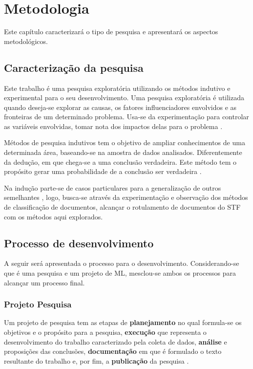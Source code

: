 \chapter[Metodologia]{Metodologia}
Este capítulo caracterizará o tipo de pesquisa e apresentará os aspectos metodológicos.

\section{Caracterização da pesquisa}

Este trabalho é uma pesquisa exploratória utilizando os métodos indutivo e experimental para o seu desenvolvimento. Uma pesquisa exploratória é utilizada quando deseja-se explorar as causas, os fatores influenciadores envolvidos e as fronteiras de um determinado problema. Usa-se da experimentação para controlar as variáveis envolvidas, tomar nota dos impactos delas para o problema \cite{PRODANOV2013}.

Métodos de pesquisa indutivos tem o objetivo de ampliar conhecimentos de uma determinada área, baseando-se na amostra de dados analisados. Diferentemente da dedução, em que chega-se a uma conclusão verdadeira. Este método tem o propósito gerar uma probabilidade de a conclusão ser verdadeira \cite{PRODANOV2013}.

Na indução parte-se de casos particulares para a generalização de outros semelhantes \cite{PRODANOV2013},
logo, busca-se através da experimentação e observação dos métodos de classificação de documentos, alcançar o rotulamento de documentos do STF com os métodos aqui explorados. 

\section{Processo de desenvolvimento}

A seguir será apresentada o processo para o desenvolvimento. Considerando-se que é uma pesquisa e um projeto de ML, mesclou-se ambos os processos para alcançar um processo final.

\subsection{Projeto Pesquisa} \label{sec:projetoPesquisa}

Um projeto de pesquisa tem as etapas de \textbf{planejamento} no qual formula-se os objetivos e o propósito para a pesquisa, \textbf{execução} que representa o desenvolvimento do trabalho caracterizado pela coleta de dados, \textbf{análise} e proposições das conclusões, \textbf{documentação} em que é formulado o texto resultante do trabalho e, por fim,  a \textbf{publicação} da pesquisa \cite{PRODANOV2013}.


